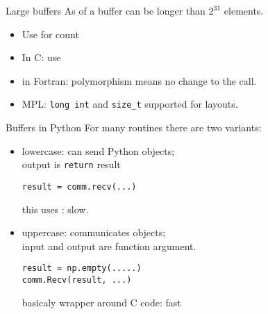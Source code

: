 \begin{numberedframe}{Large buffers}
  As of  a buffer can be longer than $2^{31}$ elements.\\
  \begin{itemize}
  \item Use  for count
  \item In C: use 
  \item in Fortran: polymorphism means no change to the call.
  \item MPL: \lstinline{long int} and \lstinline{size_t} supported for layouts.
  \end{itemize}
\end{numberedframe}

\begin{python}
  \addtocounter{slidecount}{-1}
\begin{numberedframe}{Buffers in Python}
  For many routines there are two variants:
  \begin{itemize}
  \item lowercase: can send Python objects;\\
    output is \lstinline{return} result\\
\begin{verbatim}
result = comm.recv(...)
\end{verbatim}
    this uses : slow.
  \item uppercase: communicates  objects;\\
    input and output are function argument.
\begin{verbatim}
result = np.empty(.....)
comm.Recv(result, ...)
\end{verbatim}
    basicaly wrapper around C code: fast
  \end{itemize}
\end{numberedframe}
\end{python}


